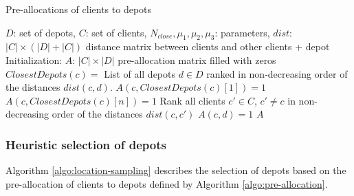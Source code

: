 \documentclass[a4paper,10pt]{article}
\begin{document}
\begin{linenumbers}
 
 \begin{algorithm}
	\caption{Pre-allocations of clients to depots}
	\label{algo:pre-allocation}
	\begin{algorithmic}[1]
		\REQUIRE  $D$: set of depots, $C$: set of clients, $N_{close}, \mu_1, \mu_2, \mu_3$: parameters, 
		$dist$: $|C|\times (|D|+|C|)$ distance matrix between clients and other clients + depot
		\STATE Initialization: $A$: $|C| \times |D|$ pre-allocation matrix filled with zeros
			\STATE $ClosestDepots(c) = $ List of all depots $d \in D$ ranked in non-decreasing order of the distances $dist(c,d)$.
			\STATE 	$A(c,ClosestDepots(c)[1]) =1$ 	
					\STATE 	$A(c,ClosestDepots(c)[n]) =1$ 			
				\ENDIF
			\ENDFOR
		\ENDFOR
			\STATE Rank all clients $c' \in C$, $c' \neq c$ in non-decreasing order of the distances $dist(c,c')$ 
							\STATE $A(c,d) =1$
						\ENDIF
					\ENDFOR
				\ENDIF
			\ENDFOR
		\ENDFOR
		\RETURN $A$
	\end{algorithmic}
\end{algorithm}







\subsubsection{Heuristic selection of depots}

Algorithm \ref{algo:location-sampling} describes the selection of depots based on the pre-allocation of clients to depots defined by Algorithm \ref{algo:pre-allocation}. 


\end{linenumbers}
\end{document}
